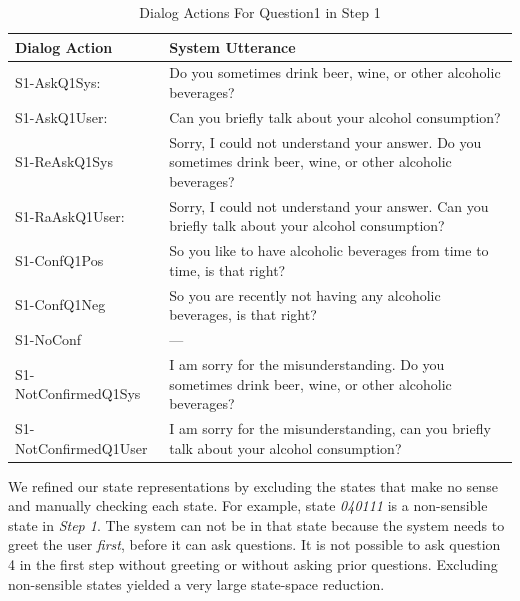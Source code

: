 \begin{sloppy}
\begin{table}[t]
\caption{Dialog Actions For Question1 in Step 1}
\label{dialogActions}    
\begin{tabular}{ | l | p{130mm} |}
    \hline
	{\bf Dialog Action} & {\bf System Utterance} \\
	\hline
	S1-AskQ1Sys: & Do you sometimes drink beer, wine, or other alcoholic beverages? \\
	S1-AskQ1User: & Can you briefly talk about your alcohol consumption? \\
	\hline
    S1-ReAskQ1Sys & Sorry, I could not understand your answer. Do you sometimes drink beer, wine, or other alcoholic beverages? \\
    S1-RaAskQ1User: & Sorry, I could not understand your answer. Can you briefly talk about your alcohol consumption? \\
\hline
S1-ConfQ1Pos & So you like to have alcoholic beverages from time to time, is that right? \\
S1-ConfQ1Neg & So you are recently not having any alcoholic beverages, is that right? \\
S1-NoConf & --- \\
\hline
	S1-NotConfirmedQ1Sys & I am sorry for the misunderstanding.  Do you sometimes drink beer, wine, or other alcoholic beverages? \\
		S1-NotConfirmedQ1User & I am sorry for the misunderstanding, can you briefly talk about your alcohol consumption? \\
 	\hline
    \end{tabular}
   \end{table}


  We refined our state representations by excluding the states that make no sense and manually checking each state. For example, state \textit{040111} is a non-sensible state in {\em Step 1}. The system can not be in that state because the system needs to greet the user {\em first}, before it can ask questions. It is not possible to ask question 4 in the first step without greeting or without asking prior questions. Excluding non-sensible states yielded a very large state-space reduction.


\end{sloppy}
